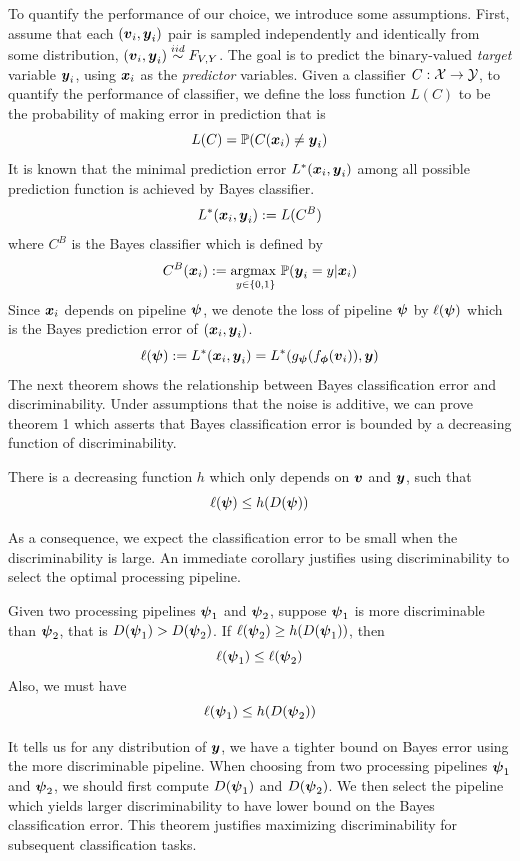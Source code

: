 \documentclass{article}
\begin{document}
To quantify the performance of our choice, we introduce some assumptions.  First, assume that each $(\boldsymbol{v}_i,\boldsymbol{y}_i)$ pair is sampled independently and identically from some distribution, $(\boldsymbol{v}_i,\boldsymbol{y}_i) \overset{iid}{\sim} F_{V,Y}$. The goal is to predict the binary-valued \emph{target} variable $\boldsymbol{y}_i$,  using $\boldsymbol{x}_i$ as the \emph{predictor} variables. Given a classifier $C: \mathcal{X} \rightarrow \mathcal{Y}$, to quantify the performance of classifier, we define the loss function $L(C)$ to be the probability of making error in prediction that is
\[L(C) = \mathbb{P}(C(\boldsymbol{x}_i) \neq \boldsymbol{y}_i) \]
It is known that the minimal prediction error $L^*(\boldsymbol{x}_i,\boldsymbol{y}_i)$ among all possible prediction function is achieved by Bayes classifier.
\[L^*(\boldsymbol{x}_i,\boldsymbol{y}_i) : = L(C^B)\]
where $C^{B}$ is the Bayes classifier which is defined by
\[C^{B}(\boldsymbol{x}_i):= \underset{y \in \{0,1\} }{\text{argmax }} \mathbb{P}(\boldsymbol{y}_i=y|\boldsymbol{x}_i)\] 
Since $\boldsymbol{x}_i$ depends on pipeline $\boldsymbol{\psi}$, we denote the loss of pipeline $\boldsymbol{\psi}$ by $\ell(\boldsymbol{\psi})$ which is the Bayes prediction error of $(\boldsymbol{x}_i, \boldsymbol{y}_i)$.
\[\ell(\boldsymbol{\psi}):= L^*(\boldsymbol{x}_i,\boldsymbol{y}_i) = L^*(g_{\boldsymbol{\psi}} (f_{\boldsymbol{\phi}} (\boldsymbol{v}_i) ),\boldsymbol{y}) \] 
The next theorem shows the relationship between Bayes classification error and discriminability. Under assumptions that the noise is additive, we can prove theorem 1 which asserts that Bayes classification error is bounded by a decreasing function of discriminability. 
\begin{thm}	
	There is a decreasing function $h$ which only depends on $\boldsymbol{v}$ and $\boldsymbol{y}$, such that
	\[\ell(\boldsymbol{\psi}) \leq h(D(\boldsymbol{\psi})) \]
\end{thm}
As a consequence, we expect the classification error to be small when the discriminability is large. An immediate corollary justifies using discriminability to select the optimal processing pipeline. 
\begin{coro}	
	Given two processing pipelines $\boldsymbol{\psi}_1$ and $\boldsymbol{\psi}_2$, suppose $\boldsymbol{\psi}_1$ is more discriminable than $\boldsymbol{\psi}_2$, that is $D(\boldsymbol{\psi}_1) > D(\boldsymbol{\psi}_2)$. If $\ell(\boldsymbol{\psi}_2) \geq h(D(\boldsymbol{\psi}_1))$, then
	\[ \ell(\boldsymbol{\psi}_1) \leq \ell(\boldsymbol{\psi}_2) \] 
	Also, we must have
	\[ \ell(\boldsymbol{\psi}_1) \leq h(D(\boldsymbol{\psi}_2)) \]
	
\end{coro}
It tells us for any distribution of $\boldsymbol{y}$, we have a tighter bound on Bayes error using the more discriminable pipeline. When choosing from two processing pipelines $\boldsymbol{\psi}_1$ and $\boldsymbol{\psi}_2$, we should first compute $D(\boldsymbol{\psi}_1)$ and $D(\boldsymbol{\psi}_2)$. We then select the pipeline which yields larger discriminability to have lower bound on the Bayes classification error. This theorem justifies maximizing discriminability for subsequent classification tasks.
\end{document}
